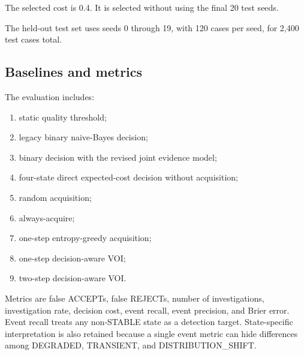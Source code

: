 \documentclass{article}
\begin{document}
\begin{table}[t]
\centering
\scriptsize
{}
\caption{Development-split selection of the investigation cost.}
\end{table}


The selected cost is 0.4. It is selected without using the final 20 test seeds.

The held-out test set uses seeds 0 through 19, with 120 cases per seed, for 2,400 test cases total.

\subsection{Baselines and metrics}

The evaluation includes:

\begin{enumerate}
\def\labelenumi{\arabic{enumi}.}
\item
  static quality threshold;
\item
  legacy binary naive-Bayes decision;
\item
  binary decision with the revised joint evidence model;
\item
  four-state direct expected-cost decision without acquisition;
\item
  random acquisition;
\item
  always-acquire;
\item
  one-step entropy-greedy acquisition;
\item
  one-step decision-aware VOI;
\item
  two-step decision-aware VOI.
\end{enumerate}

Metrics are false ACCEPTs, false REJECTs, number of investigations, investigation rate, decision cost, event recall, event precision, and Brier error. Event recall treats any non-STABLE state as a detection target. State-specific interpretation is also retained because a single event metric can hide differences among DEGRADED, TRANSIENT, and DISTRIBUTION\_SHIFT.
\end{document}
